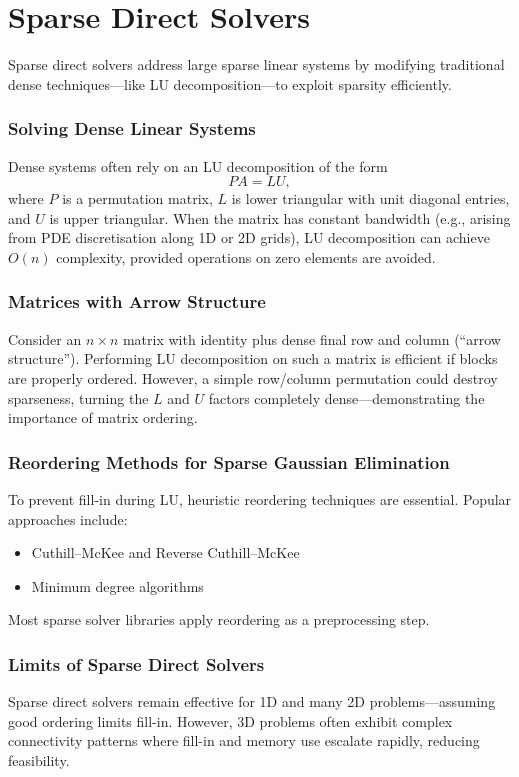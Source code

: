 \documentclass[11pt,a4paper]{book}
\begin{document}
\chapter{Sparse Direct Solvers}

Sparse direct solvers address large sparse linear systems by modifying traditional dense techniques—like LU decomposition—to exploit sparsity efficiently.

\subsection*{Solving Dense Linear Systems}
Dense systems often rely on an LU decomposition of the form
\[
PA = LU,
\]
where \(P\) is a permutation matrix, \(L\) is lower triangular with unit diagonal entries, and \(U\) is upper triangular. When the matrix has constant bandwidth (e.g., arising from PDE discretisation along 1D or 2D grids), LU decomposition can achieve \(O(n)\) complexity, provided operations on zero elements are avoided.

\subsection*{Matrices with Arrow Structure}
Consider an \(n \times n\) matrix with identity plus dense final row and column (“arrow structure”). Performing LU decomposition on such a matrix is efficient if blocks are properly ordered. However, a simple row/column permutation could destroy sparseness, turning the \(L\) and \(U\) factors completely dense—demonstrating the importance of matrix ordering.

\subsection*{Reordering Methods for Sparse Gaussian Elimination}
To prevent fill-in during LU, heuristic reordering techniques are essential. Popular approaches include:
\begin{itemize}
  \item Cuthill–McKee and Reverse Cuthill–McKee
  \item Minimum degree algorithms
\end{itemize}
Most sparse solver libraries apply reordering as a preprocessing step.

\subsection*{Limits of Sparse Direct Solvers}
Sparse direct solvers remain effective for 1D and many 2D problems—assuming good ordering limits fill-in. However, 3D problems often exhibit complex connectivity patterns where fill-in and memory use escalate rapidly, reducing feasibility.
\end{document}
